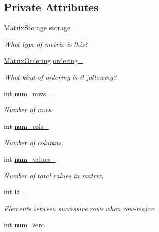 \subsection*{Private Attributes}
\begin{DoxyCompactItemize}
\item 
\hyperlink{group__c02-enums_ga25b67ec6a2afeee69f9bb196a9c66619}{Matrix\-Storage} \hyperlink{classmtk_1_1Matrix_ae343697531e0849f20bed4a9760b9a54}{storage\-\_\-}
\begin{DoxyCompactList}\small\item\em What type of matrix is this? \end{DoxyCompactList}\item 
\hyperlink{group__c02-enums_ga622801bd9f912d0f976c3e383f5f581c}{Matrix\-Ordering} \hyperlink{classmtk_1_1Matrix_a8b66e0d130cc8ad19c426acd42edaf55}{ordering\-\_\-}
\begin{DoxyCompactList}\small\item\em What kind of ordering is it following? \end{DoxyCompactList}\item 
int \hyperlink{classmtk_1_1Matrix_ab635ce1dd96c26ee99a75b564f03f091}{num\-\_\-rows\-\_\-}
\begin{DoxyCompactList}\small\item\em Number of rows. \end{DoxyCompactList}\item 
int \hyperlink{classmtk_1_1Matrix_a3d11a942d6dda7ca16e162c12e854b74}{num\-\_\-cols\-\_\-}
\begin{DoxyCompactList}\small\item\em Number of columns. \end{DoxyCompactList}\item 
int \hyperlink{classmtk_1_1Matrix_ac3f64429ee2509c502ce7f0d75341da0}{num\-\_\-values\-\_\-}
\begin{DoxyCompactList}\small\item\em Number of total values in matrix. \end{DoxyCompactList}\item 
int \hyperlink{classmtk_1_1Matrix_a8cb46a0aa1d665a9f92f14e66a307bd5}{ld\-\_\-}
\begin{DoxyCompactList}\small\item\em Elements between successive rows when row-\/major. \end{DoxyCompactList}\item 
int \hyperlink{classmtk_1_1Matrix_a6daac2b61bed10026785c1eb0328eef9}{num\-\_\-zero\-\_\-}

\end{DoxyCompactItemize}
